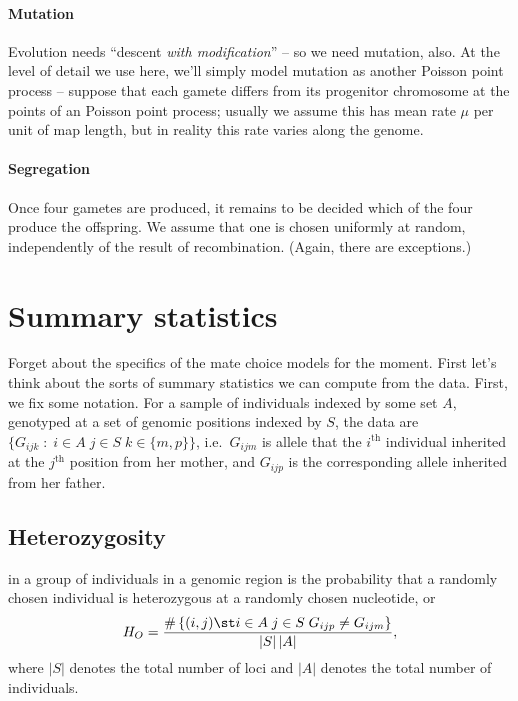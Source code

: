 \paragraph{Mutation}
Evolution needs ``descent \emph{with modification}'' -- so we need mutation, also.
At the level of detail we use here, we'll simply model mutation as another Poisson point process --
suppose that each gamete differs from its progenitor chromosome at the points of an Poisson point process;
usually we assume this has mean rate $\mu$ per unit of map length,
but in reality this rate varies along the genome.

\paragraph{Segregation}
Once four gametes are produced, it remains to be decided which of the four produce the offspring.
We assume that one is chosen uniformly at random,
independently of the result of recombination.
(Again, there are exceptions.)


\section{Summary statistics}

Forget about the specifics of the mate choice models for the moment.
First let's think about the sorts of summary statistics we can compute from the data.
First, we fix some notation.
For a sample of individuals indexed by some set $A$,
genotyped at a set of genomic positions indexed by $S$,
the data are $\{G_{ijk} \; : \; i \in A \; j \in S \; k \in \{m,p\} \}$,
i.e.\ $G_{ijm}$ is allele that the $i^\mathrm{th}$ individual inherited at the $j^\mathrm{th}$ position from her mother,
and $G_{ijp}$ is the corresponding allele inherited from her father.


\subsection{Heterozygosity} in a group of individuals in a genomic region 
is the probability that a randomly chosen individual is heterozygous at a randomly chosen nucleotide,
or 
\begin{align}
  H_O = \frac{ \# \left\{ (i,j) \st i \in A \; j \in S \; G_{ijp} \neq G_{ijm} \right\} }{ |S|\,|A| } ,
\end{align}
where $|S|$ denotes the total number of loci and $|A|$ denotes the total number of individuals.

